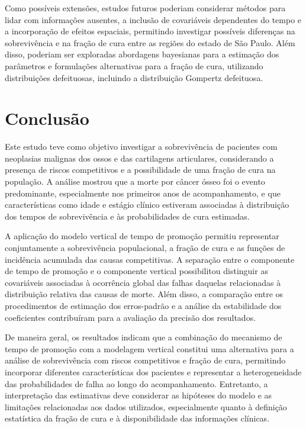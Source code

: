 \documentclass[11pt,a4paper]{article}
\begin{document}
Como possíveis extensões, estudos futuros poderiam considerar métodos para lidar com informações ausentes, a inclusão de covariáveis dependentes do tempo e a incorporação de efeitos espaciais, permitindo investigar possíveis diferenças na sobrevivência e na fração de cura entre as regiões do estado de São Paulo. Além disso, poderiam ser exploradas abordagens bayesianas para a estimação dos parâmetros e formulações alternativas para a fração de cura, utilizando distribuições defeituosas, incluindo a distribuição Gompertz defeituosa.


\section{Conclusão}

Este estudo teve como objetivo investigar a sobrevivência de pacientes com neoplasias malignas dos ossos e das cartilagens articulares, considerando a presença de riscos competitivos e a possibilidade de uma fração de cura na população. A análise mostrou que a morte por câncer ósseo foi o evento predominante, especialmente nos primeiros anos de acompanhamento, e que características como idade e estágio clínico estiveram associadas à distribuição dos tempos de sobrevivência e às probabilidades de cura estimadas.

A aplicação do modelo vertical de tempo de promoção permitiu representar conjuntamente a sobrevivência populacional, a fração de cura e as funções de incidência acumulada das causas competitivas. A separação entre o componente de tempo de promoção e o componente vertical possibilitou distinguir as covariáveis associadas à ocorrência global das falhas daquelas relacionadas à distribuição relativa das causas de morte. Além disso, a comparação entre os procedimentos de estimação dos erros-padrão e a análise da estabilidade dos coeficientes contribuíram para a avaliação da precisão dos resultados.

De maneira geral, os resultados indicam que a combinação do mecanismo de tempo de promoção com a modelagem vertical constitui uma alternativa para a análise de sobrevivência com riscos competitivos e fração de cura, permitindo incorporar diferentes características dos pacientes e representar a heterogeneidade das probabilidades de falha ao longo do acompanhamento. Entretanto, a interpretação das estimativas deve considerar as hipóteses do modelo e as limitações relacionadas aos dados utilizados, especialmente quanto à definição estatística da fração de cura e à disponibilidade das informações clínicas.
\end{document}
